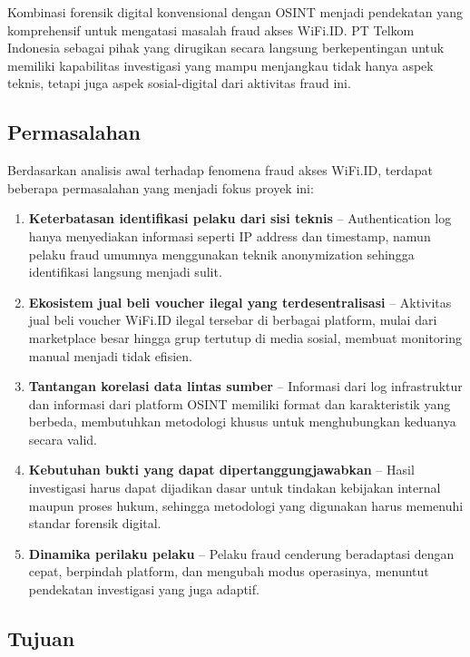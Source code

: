 \documentclass{ittelkom_ppi}
\begin{document}
Kombinasi forensik digital konvensional dengan OSINT menjadi pendekatan yang komprehensif untuk mengatasi masalah fraud akses WiFi.ID. PT Telkom Indonesia sebagai pihak yang dirugikan secara langsung berkepentingan untuk memiliki kapabilitas investigasi yang mampu menjangkau tidak hanya aspek teknis, tetapi juga aspek sosial-digital dari aktivitas fraud ini.


\subsection{Permasalahan} \label{probstatement}
\justifying

Berdasarkan analisis awal terhadap fenomena fraud akses WiFi.ID, terdapat beberapa permasalahan yang menjadi fokus proyek ini:

\begin{enumerate}
    \item \textbf{Keterbatasan identifikasi pelaku dari sisi teknis} -- Authentication log hanya menyediakan informasi seperti IP address dan timestamp, namun pelaku fraud umumnya menggunakan teknik anonymization sehingga identifikasi langsung menjadi sulit.
    
    \item \textbf{Ekosistem jual beli voucher ilegal yang terdesentralisasi} -- Aktivitas jual beli voucher WiFi.ID ilegal tersebar di berbagai platform, mulai dari marketplace besar hingga grup tertutup di media sosial, membuat monitoring manual menjadi tidak efisien.
    
    \item \textbf{Tantangan korelasi data lintas sumber} -- Informasi dari log infrastruktur dan informasi dari platform OSINT memiliki format dan karakteristik yang berbeda, membutuhkan metodologi khusus untuk menghubungkan keduanya secara valid.
    
    \item \textbf{Kebutuhan bukti yang dapat dipertanggungjawabkan} -- Hasil investigasi harus dapat dijadikan dasar untuk tindakan kebijakan internal maupun proses hukum, sehingga metodologi yang digunakan harus memenuhi standar forensik digital.
    
    \item \textbf{Dinamika perilaku pelaku} -- Pelaku fraud cenderung beradaptasi dengan cepat, berpindah platform, dan mengubah modus operasinya, menuntut pendekatan investigasi yang juga adaptif.
\end{enumerate}


\subsection{Tujuan} \label{hyp}
\justifying
\end{document}
